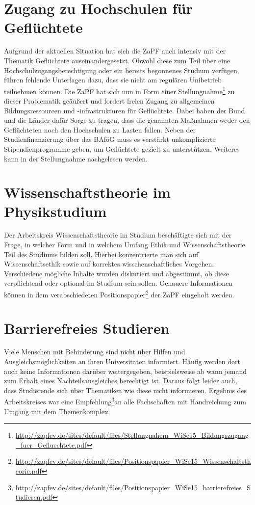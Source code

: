 \section*{Zugang zu Hochschulen für Geflüchtete}
Aufgrund der aktuellen Situation hat sich die ZaPF auch intensiv mit der Thematik \glqq{}Geflüchtete\grqq{} auseinandergesetzt. Obwohl diese zum Teil über eine Hochschulzugangsberechtigung oder ein bereits begonnenes Studium verfügen, führen fehlende Unterlagen dazu, dass sie nicht am regulären Unibetrieb teilnehmen können. Die ZaPF hat sich nun in Form einer Stellungnahme\footnote{\href{http://zapfev.de/sites/default/files/Stellungnahem\_WiSe15\_Bildungszugang\_fuer\_Gefluechtete.pdf}{\url{http://zapfev.de/sites/default/files/Stellungnahem\_WiSe15\_Bildungszugang\_fuer\_Gefluechtete.pdf}}} zu dieser Problematik geäußert und fordert freien Zugang zu allgemeinen Bildungsressourcen und -infrastrukturen für Geflüchtete. Dabei haben der Bund und die Länder dafür Sorge zu tragen, dass die genannten Maßnahmen weder den Geflüchteten noch den Hochschulen zu Lasten fallen. Neben der Studienfinanzierung über das BAföG muss es verstärkt unkomplizierte Stipendienprogramme geben, um Geflüchtete gezielt zu unterstützen. Weiteres kann in der Stellungnahme nachgelesen werden.

\section*{Wissenschaftstheorie im Physikstudium}
Der  Arbeitskreis \glqq{}Wissenschaftstheorie im Studium\grqq{} beschäftigte sich mit der Frage, in welcher Form und in welchem Umfang Ethik und Wissenschaftstheorie Teil des Studiums bilden soll. Hierbei konzentrierte man sich auf Wissenschaftsethik sowie auf korrektes wisschenschaftliches Vorgehen. Verschiedene mögliche Inhalte wurden diskutiert und abgestimmt, ob diese verpflichtend oder optional im Studium sein sollen. Genauere Informationen können in dem verabschiedeten Positionspapier\footnote{\href{http://zapfev.de/sites/default/files/Positionspapier\_WiSe15\_Wissenschaftstheorie.pdf}{\url{http://zapfev.de/sites/default/files/Positionspapier\_WiSe15\_Wissenschaftstheorie.pdf}}} der ZaPF eingeholt werden.

\section*{Barrierefreies Studieren}
Viele Menschen mit Behinderung sind nicht über Hilfen und Ausgleichsmöglichkeiten an ihren Universitäten informiert. Häufig werden dort auch keine Informationen darüber weitergegeben, beispielsweise ab wann jemand zum Erhalt eines Nachteilsausgleiches berechtigt ist. Daraus folgt leider auch, dass Studierende sich über Thematiken wie diese nicht informieren.
Ergebnis des Arbeitskreises war eine Empfehlung\footnote{\href{http://zapfev.de/sites/default/files/Positionspapier\_WiSe15\_barrierefreies\_Studieren.pdf}{\url{http://zapfev.de/sites/default/files/Positionspapier\_WiSe15\_barrierefreies\_Studieren.pdf}}}an alle Fachschaften mit Handreichung zum Umgang mit dem Themenkomplex.

